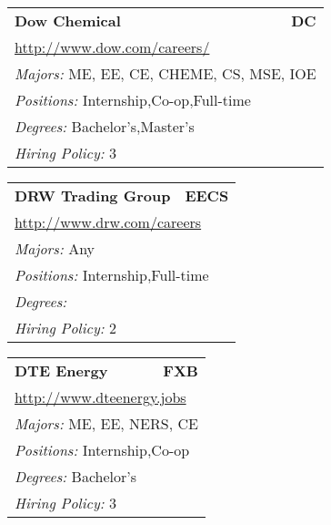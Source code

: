 \documentclass[twoside]{article}
\begin{document}
\begin{center}
\begin{multicols}{3}
\begin{FlushLeft}
\begin{minipage}{\columnwidth}
\end{minipage}
 
\begin{minipage}{\columnwidth}\begin{tabularx}{.95\columnwidth}{Xr}
                 {\Large\bf Dow Chemical} & {\Large\bf DC}\\
    \multicolumn{2}{p{.95\columnwidth}}{\url{http://www.dow.com/careers/}}\\
    \multicolumn{2}{p{.95\columnwidth}}{\emph{Majors:} ME, EE, CE, CHEME, CS, MSE, IOE}\\
    \multicolumn{2}{p{.95\columnwidth}}{\emph{Positions:} Internship,Co-op,Full-time}\\
    \multicolumn{2}{p{.95\columnwidth}}{\emph{Degrees:} Bachelor's,Master's}\\
    \multicolumn{2}{p{.95\columnwidth}}{\emph{Hiring Policy:} 3}\\
    \end{tabularx}
    
\end{minipage}
 
\begin{minipage}{\columnwidth}\begin{tabularx}{.95\columnwidth}{Xr}
                 {\Large\bf DRW Trading Group} & {\Large\bf EECS}\\
    \multicolumn{2}{p{.95\columnwidth}}{\url{http://www.drw.com/careers}}\\
    \multicolumn{2}{p{.95\columnwidth}}{\emph{Majors:} Any}\\
    \multicolumn{2}{p{.95\columnwidth}}{\emph{Positions:} Internship,Full-time}\\
    \multicolumn{2}{p{.95\columnwidth}}{\emph{Degrees:} }\\
    \multicolumn{2}{p{.95\columnwidth}}{\emph{Hiring Policy:} 2}\\
    \end{tabularx}
    
\end{minipage}
 
\begin{minipage}{\columnwidth}\begin{tabularx}{.95\columnwidth}{Xr}
                 {\Large\bf DTE Energy} & {\Large\bf FXB}\\
    \multicolumn{2}{p{.95\columnwidth}}{\url{http://www.dteenergy.jobs}}\\
    \multicolumn{2}{p{.95\columnwidth}}{\emph{Majors:} ME, EE, NERS, CE}\\
    \multicolumn{2}{p{.95\columnwidth}}{\emph{Positions:} Internship,Co-op}\\
    \multicolumn{2}{p{.95\columnwidth}}{\emph{Degrees:} Bachelor's}\\
    \multicolumn{2}{p{.95\columnwidth}}{\emph{Hiring Policy:} 3}\\
    \end{tabularx}
    

\end{minipage}
\end{FlushLeft}
\end{multicols}
\end{center}
\end{document}
